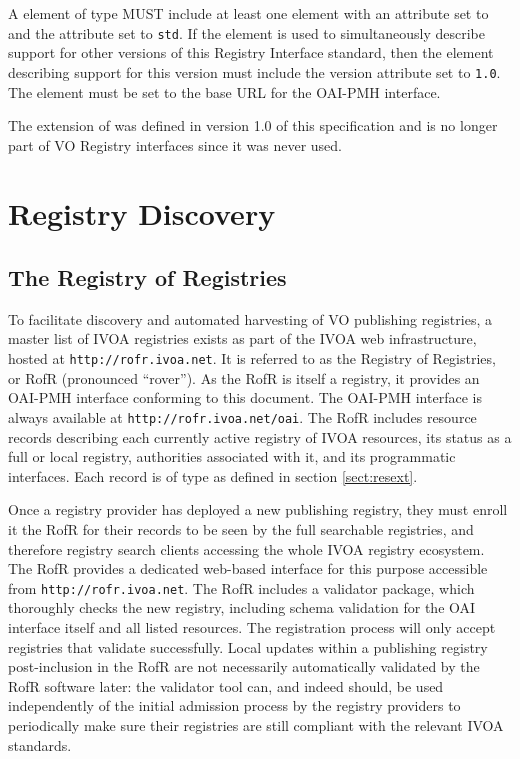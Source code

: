 \documentclass{ivoa}
\begin{document}
A  element of type  MUST
include at least one  element with an
 attribute set to  and the
 attribute set to \texttt{std}. If the
 element is used to simultaneously describe
support for other versions of this Registry Interface standard, then the
 element describing support for this version must
include the version attribute set to \texttt{1.0}. The
 element must be set to the base URL for the
OAI-PMH interface.

The  extension of 
was defined in version 1.0 of this specification and is no longer part of VO
Registry interfaces since it was never used.

\section{Registry Discovery}

\subsection{The Registry of Registries}

\label{sect:rofr}

To facilitate discovery and automated harvesting of VO publishing registries,
a master list of IVOA registries exists as part of the IVOA web 
infrastructure, hosted at \nolinkurl{http://rofr.ivoa.net}. 
It is referred to as the Registry of Registries, or RofR (pronounced ``rover''). 
As the RofR is itself a registry, it provides an OAI-PMH interface conforming 
to this document. The OAI-PMH interface is always available at
\nolinkurl{http://rofr.ivoa.net/oai}. The RofR includes resource records 
describing each currently active registry of IVOA resources, its status
as a full or local registry, authorities associated with it, and its 
programmatic interfaces. Each record is of type  as 
defined in section \ref{sect:resext}. 

Once a registry provider has deployed a new publishing registry, they
must enroll it the RofR for their records to be seen by the full 
searchable registries, and therefore registry search clients accessing 
the whole IVOA registry ecosystem. The RofR provides a dedicated 
web-based interface for this purpose accessible
from \nolinkurl{http://rofr.ivoa.net}.  The RofR includes a
validator package, which thoroughly checks the new registry, including
schema validation for the OAI interface itself and all listed resources.
The registration process will only accept registries that validate
successfully.  Local updates within a publishing registry post-inclusion
in the RofR are not necessarily automatically validated by the RofR
software later: the validator tool can, and indeed should, be used
independently of the initial admission process by the registry providers
to periodically make sure their registries are still compliant with the
relevant IVOA standards. 
\end{document}
